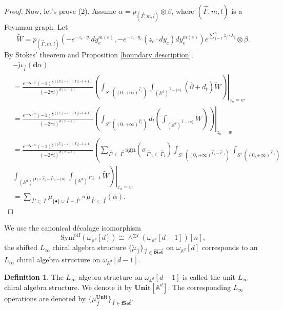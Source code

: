 \documentclass[11pt]{amsart}
\theoremstyle{definition}
\newtheorem{defn}[thm]{Definition}
\theoremstyle{remark}
\numberwithin{equation}{section}
\begin{document}
\begin{proof}
    Now, let's prove (2). Assume $\alpha=p_{(\vec{\Gamma},m,l)}\otimes\beta$, where $(\vec{\Gamma},m,l)$ is a Feynman graph. Let
    $$
    \tilde{W}=p_{(\vec{\Gamma},m,l)}(-e^{-z_{e}\cdot y_{e}}dy_{e}^{m(e)},-e^{-z_{e}\cdot y_{e}}(z_{e}\cdot dy_{e})dy_{e}^{m(e)})e^{\sum_{j=1}^{n}z_{j}\cdot\lambda_{j}}\otimes\beta.
    $$
    By Stokes' theorem and Proposition \ref{boundary description},
    \begin{align*}
        &-\tilde{\mu}_{\vec{I}}(\mathbf{d}\alpha)\\
        &=\frac{e^{-\lambda_{\bullet}\cdot w}(-1)^{\frac{1}{2}(|\Gamma_{1}|-l)(\Gamma_{1}|-l+1)}}{(-2\pi i)^{d(n-1)}}\left.\left(\int_{S^{+}((0,+\infty)^{\vec{\Gamma}_{1}})}\int_{(\mathbb{A}^{d})^{\vec{I}-\{n\}}}(\bar{\partial}+d_t)\tilde{W}\right)\right|_{z_n=w}\\
        &=
        \frac{e^{-\lambda_{\bullet}\cdot w}(-1)^{\frac{1}{2}(|\Gamma_{1}|-l)(\Gamma_{1}|-l+1)}}{(-2\pi i)^{d(n-1)}}\left.\left(\int_{S^{+}((0,+\infty)^{\vec{\Gamma}_{1}})}d_{t}\left(\int_{(\mathbb{A}^{d})^{\vec{I}-\{n\}}}\tilde{W}\right)\right)\right|_{z_n=w}\\
        &=
        \frac{e^{-\lambda_{\bullet}\cdot w}(-1)^{\frac{1}{2}(|\Gamma_{1}|-l)(\Gamma_{1}|-l+1)}}{(-2\pi i)^{d(n-1)}}\left(\sum_{\vec{\Gamma}'\subset \vec{\Gamma}}\mathrm{sgn}(\sigma_{\vec{\Gamma}'_{1}\subset \vec{\Gamma}_{1}})\int_{S^{+}((0,+\infty)^{\vec{\Gamma}_{1}- \vec{\Gamma}'_{1}})}\int_{S^{+}((0,+\infty)^{\vec{\Gamma}'_{1}})}\right.\\
        &
        \left.\left.\int_{(\mathbb{A}^{d})^{\{\bullet\}\cup\vec{\Gamma}_{0}-\vec{\Gamma}'_{0}-\{n\}}}\int_{(\mathbb{A}^{d})^{|\Gamma'_{0}|-1}}\tilde{W}\right)\right|_{z_n=w}\\
        &=
        \sum_{\vec{I}'\subset\vec{I}}\tilde{\mu}_{\{\bullet\}\cup\vec{I}-\vec{I}'}\circ \tilde{\mu}_{\vec{I}'\subset\vec{I}}(\alpha).
    \end{align*}
\end{proof}

We use the canonical décalage isomorphism
$$
\mathrm{Sym}^{\boxtimes I}(\omega_{\mathbb{A}^{d}}[d])\cong \wedge^{\boxtimes I}(\omega_{\mathbb{A}^{d}}[d-1])[n],
$$
the shifted $L_{\infty}$ chiral algebra structure $\{\tilde{\mu}_{\vec{I}}\}_{\vec{I}\in \overrightarrow{\mathbf{fSet}}}$ on $\omega_{\mathbb{A}^{d}}[d]$ corresponds to an $L_{\infty}$ chiral algebra structure on $\omega_{\mathbb{A}^{d}}[d-1]$.
\begin{defn}
    The $L_{\infty}$ algebra structure on $\omega_{\mathbb{A}^{d}}[d-1]$ is called the unit $L_{\infty}$ chiral algebra structure. We denote it by $\mathbf{Unit}[\mathbb{A}^d]$. The corresponding $L_{\infty}$ operations are denoted by $\{\mu^{\mathbf{Unit}}_{\vec{I}}\}_{\vec{I}\in \overrightarrow{\mathbf{fSet}}}$.
\end{defn}
\end{document}
